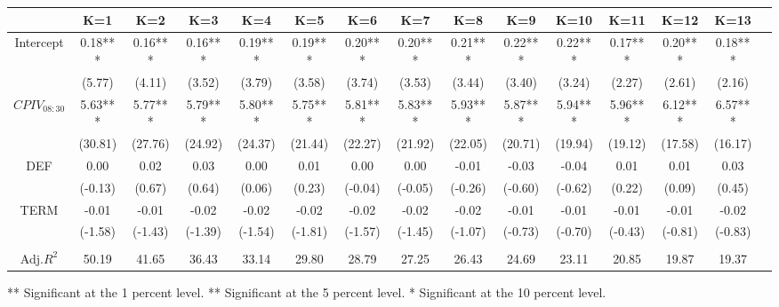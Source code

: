 \begin{table}[h]
\begin{threeparttable}
\begin{tabular}{ccccccccccccccc}
          & K=1     & K=2     & K=3     & K=4     & K=5     & K=6     & K=7     & K=8     & K=9     & K=10    & K=11    & K=12    & K=13    \\ \midrule
Intercept & 0.18*** & 0.16*** & 0.16*** & 0.19*** & 0.19*** & 0.20*** & 0.20*** & 0.21*** & 0.22*** & 0.22*** & 0.17*** & 0.20*** & 0.18*** \\
          & (5.77)  & (4.11)  & (3.52)  & (3.79)  & (3.58)  & (3.74)  & (3.53)  & (3.44)  & (3.40)  & (3.24)  & (2.27)  & (2.61)  & (2.16)  \\
$CPIV_{08:30}$& 5.63*** & 5.77*** & 5.79*** & 5.80*** & 5.75*** & 5.81*** & 5.83*** & 5.93*** & 5.87*** & 5.94*** & 5.96*** & 6.12*** & 6.57*** \\
          & (30.81) & (27.76) & (24.92) & (24.37) & (21.44) & (22.27) & (21.92) & (22.05) & (20.71) & (19.94) & (19.12) & (17.58) & (16.17) \\
DEF       & 0.00    & 0.02    & 0.03    & 0.00    & 0.01    & 0.00    & 0.00    & -0.01   & -0.03   & -0.04   & 0.01    & 0.01    & 0.03    \\
          & (-0.13) & (0.67)  & (0.64)  & (0.06)  & (0.23)  & (-0.04) & (-0.05) & (-0.26) & (-0.60) & (-0.62) & (0.22)  & (0.09)  & (0.45)  \\
TERM      & -0.01   & -0.01   & -0.02   & -0.02   & -0.02   & -0.02   & -0.02   & -0.02   & -0.01   & -0.01   & -0.01   & -0.01   & -0.02   \\
          & (-1.58) & (-1.43) & (-1.39) & (-1.54) & (-1.81) & (-1.57) & (-1.45) & (-1.07) & (-0.73) & (-0.70) & (-0.43) & (-0.81) & (-0.83) \\
          &         &         &         &         &         &         &         &         &         &         &         &         &         \\
Adj.$R^{2}$    & 50.19   & 41.65   & 36.43   & 33.14   & 29.80   & 28.79   & 27.25   & 26.43   & 24.69   & 23.11   & 20.85   & 19.87   & 19.37   \\

\bottomrule
\end{tabular}

\begin{tablenotes}
\item *** Significant at the 1 percent level.    
** Significant at the 5 percent level.   
* Significant at the 10 percent level.
\end{tablenotes}


\end{threeparttable}

\end{table}


